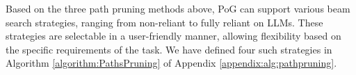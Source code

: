 Based on the three path pruning methods above,
PoG can support various beam search strategies, ranging from non-reliant to fully reliant on LLMs. These strategies are selectable in a user-friendly manner, allowing flexibility based on the specific requirements of the task. We have defined four such strategies in Algorithm \ref{algorithm:PathsPruning} of Appendix \ref{appendix:alg:pathpruning}. 





